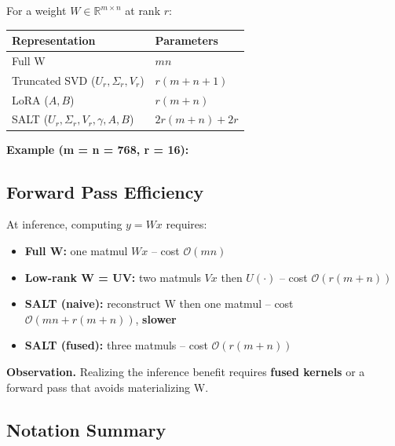 For a weight $W \in \mathbb{R}^{m \times n}$ at rank $r$:

\begin{table}[H]
\centering
\small
\begin{tabular}{ll}
\toprule
\textbf{Representation} & \textbf{Parameters} \\
\midrule
Full W & $mn$ \\
Truncated SVD ($U_r, \Sigma_r, V_r$) & $r(m + n + 1)$ \\
LoRA ($A, B$) & $r(m + n)$ \\
SALT ($U_r, \Sigma_r, V_r, \gamma, A, B$) & $2r(m + n) + 2r$ \\
\bottomrule
\end{tabular}
\end{table}

\textbf{Example (m = n = 768, r = 16):}

\subsection{Forward Pass Efficiency}

At inference, computing $y = Wx$ requires:

\begin{itemize}
\item \textbf{Full W:} one matmul $Wx$ -- cost $\mathcal{O}(mn)$
\item \textbf{Low-rank W = UV:} two matmuls $Vx$ then $U(\cdot)$ -- cost $\mathcal{O}(r(m+n))$
\item \textbf{SALT (naive):} reconstruct W then one matmul -- cost $\mathcal{O}(mn + r(m+n))$, \textbf{slower}
\item \textbf{SALT (fused):} three matmuls -- cost $\mathcal{O}(r(m+n))$

\end{itemize}
\textbf{Observation.} Realizing the inference benefit requires \textbf{fused kernels} 
or a forward pass that avoids materializing W.

\subsection{Notation Summary}

